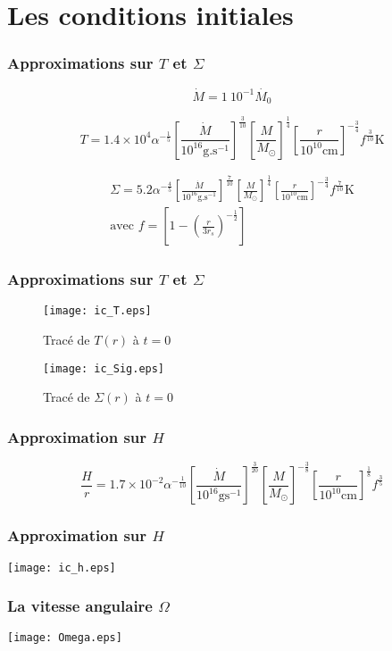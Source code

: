 \section{Les conditions initiales}
\begin{frame}
\frametitle{Approximations sur $T$ et $\Sigma$}
\begin{equation*}
	\dot{M} = 1\ 10^{-1 }\dot{M_{0}}
\end{equation*} 

	\begin{equation*}
	T = 1.4 \times 10^{4} \alpha^{- \frac{1}{5}} \left[ \frac{\dot{M}}{10^{16} \mathrm{g.s}^{-1}} \right]^{\frac{3}{10}} \left[ \frac{M}{M_\odot}\right]^{\frac{1}{4}} \left[ \frac{r}{10^{10}\mathrm{cm}}\right]^{- \frac{3}{4}} f^{\frac{3}{10}} \mathrm{K} 
\end{equation*}

\begin{equation*}
	\begin{aligned}
		\Sigma = 5.2 \alpha^{- \frac{4}{5}} \left[ \frac{\dot{M}}{10^{16} \mathrm{g.s}^{-1}} \right]^{\frac{7}{10}} \left[ \frac{M}{M_\odot}\right]^{\frac{1}{4}} \left[ \frac{r}{10^{10} \mathrm{cm}}\right]^{- \frac{3}{4}} f^{\frac{7}{10}} \mbox{K}  \\ 
	\text{avec } f = \left[ 1 - \left( \frac{r}{3 r_{s}}\right)^{- \frac{1}{2}}\right]
		\end{aligned}
\end{equation*}
\end{frame}

\begin{frame}
\frametitle{Approximations sur $T$ et $\Sigma$}
 \begin{figure}[ht]
   \begin{minipage}[c]{.46\linewidth}
      \texttt{[image: ic\_T.eps]}
      \caption{Tracé de $T(r)$ à $t = 0$}
   \end{minipage} \hfill
   \begin{minipage}[c]{.46\linewidth}
      \texttt{[image: ic\_Sig.eps]}
      \caption{Tracé de $\Sigma(r)$ à $t = 0$}
   \end{minipage}
\end{figure} 
\end{frame}

\begin{frame}
\frametitle{Approximation sur $H$}
	\begin{equation*}
	\frac{H}{r} = 1.7 \times 10^{-2}\alpha^{- \frac{1}{10}} \left[ \frac{\dot{M}}{10^{16} \mbox{g} \mbox{s}^{-1}} \right]^{\frac{3}{20}} \left[ \frac{M}{M_\odot}\right]^{- \frac{3}{8}} \left[ \frac{r}{10^{10} \mathrm{cm}}\right]^{\frac{1}{8}} f^{\frac{3}{5}}
\end{equation*}
\end{frame}

\begin{frame}
\frametitle{Approximation sur $H$}
	\begin{center}
		\texttt{[image: ic\_h.eps]}
	\end{center}
\end{frame}

\begin{frame}
\frametitle{La vitesse angulaire $\Omega$}
	\begin{center}
		\texttt{[image: Omega.eps]}
	\end{center}
\end{frame}